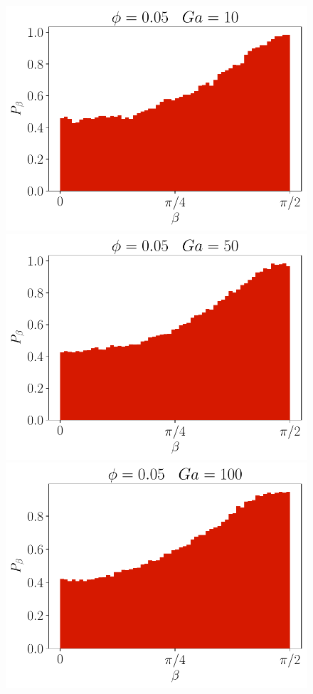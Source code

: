 \begin{figure}[h!]
    \centering
    \includegraphics[height =\size]{image/N_10/beta/2DMAP_beta_dmin_10_Bo1PHI0_05mu_r0_042Ga10.pdf}
    \includegraphics[height =\size]{image/N_10/beta/2DMAP_beta_dmin_10_Bo1PHI0_05mu_r0_042Ga50.pdf}
    \includegraphics[height =\size]{image/N_10/beta/2DMAP_beta_dmin_10_Bo1PHI0_05mu_r0_042Ga100.pdf}

\end{figure}
